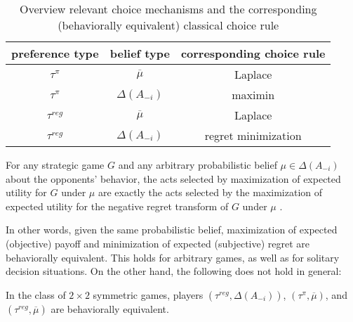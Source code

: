 \documentclass[fleqn,reqno,11pt]{article}
\begin{document}
\begin{table}[t]
  \centering
  \begin{tabular}{ccc}
    preference type & belief type & corresponding choice rule \\ \midrule
    $\tau^\pi$ & $\overline{\mu}$ & Laplace \\
    $\tau^\pi$ & $\Delta(A_{-i})$ & maximin \\ 
    $\tau^{reg}$ & $\overline{\mu}$ & Laplace \\
    $\tau^{reg}$ & $\Delta(A_{-i})$ & regret minimization \\ 
  \end{tabular}
  \caption{Overview relevant choice mechanisms and the corresponding (behaviorally equivalent) classical choice rule}
  \label{tab:CMs}
\end{table}


\begin{fact} \label{fact:maxEU-minReg} For any strategic game $G$ and any arbitrary
  probabilistic belief $\mu \in \Delta(A_{-i})$ about the opponents' behavior, the acts
  selected by maximization of expected utility for $G$ under $\mu$ are exactly the acts
  selected by the maximization of expected utility for the negative regret transform of $G$
  under $\mu$ \citep[e.g.][]{HalpernPass2012:Iterated-Regret}.
\end{fact}

\noindent In other words, given the same probabilistic belief, maximization of expected
(objective) payoff and minimization of expected (subjective) regret are behaviorally
equivalent. This holds for arbitrary games, as well as for solitary decision situations. On the
other hand, the following does not hold in general:

\begin{fact} \label{fact:equivalence2x2}
In the class of $2 \times 2$ symmetric games, players $(\tau^{reg}, \Delta(A_{-i}))$, $(\tau^{\pi}, \overline{\mu})$, and $(\tau^{reg},\overline{\mu})$ are behaviorally equivalent.
\end{fact} 
\end{document}
